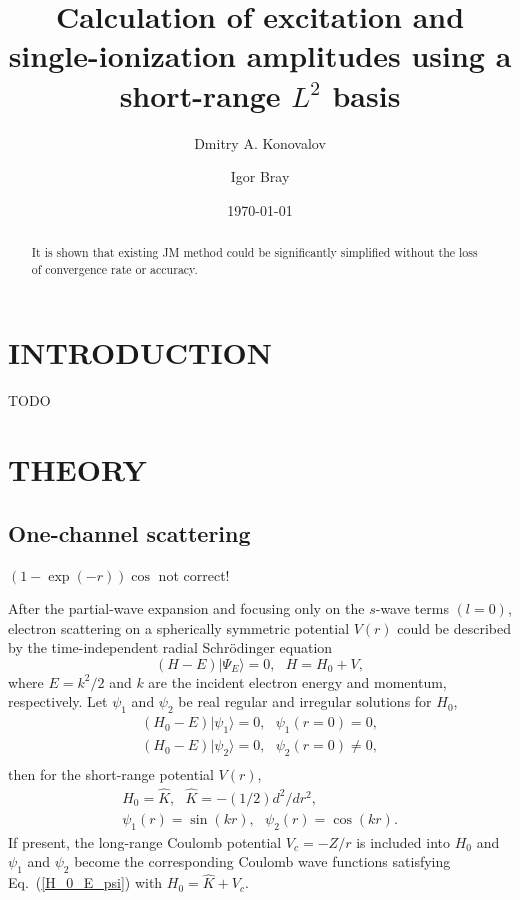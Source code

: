 \documentclass[aip
, pra
, showpacs
, aps
, twocolumn
, groupedaddress
, floatfix
]{revtex4}
\newcommand{\beq}{\begin{equation}}
\newcommand{\eeq}{\end{equation}}
\newcommand{\barr}{\begin{array}}
\newcommand{\earr}{\end{array}}
\begin{document}
\title {Calculation of excitation and single-ionization amplitudes using a short-range $L^2$ basis}

\author{Dmitry A. Konovalov}

\author{Igor Bray}


\date{\today}

\begin{abstract}
It is shown that existing JM method could be significantly simplified without the loss of convergence rate or accuracy.

\end{abstract}

\maketitle

\section{INTRODUCTION}
TODO

\section{THEORY}
\subsection{One-channel scattering}


$(1-\exp(-r))\cos$ \cite{Nesbet68} not correct!


After the partial-wave expansion \cite{Taylor72,N82} and focusing only on the $s$-wave terms $(l=0)$,
electron scattering on a spherically symmetric potential $V(r)$
could be described by the time-independent radial Schr\"odinger equation
\beq
(H-E) | \Psi_E \rangle =0,  \ \ \ H = H_0 + V, \label{H_E_Psi_E}
\eeq
where $E=k^2/2$ and $k$ are the incident electron energy and momentum, respectively.
Let $\psi_1$ and $\psi_2$ be real regular and irregular solutions for $H_0$,
\beq \barr{l}
(H_0-E) | \psi_1 \rangle =0,  \ \ \ \psi_1(r=0) = 0,\\
(H_0-E) | \psi_2 \rangle =0,  \ \ \ \psi_2(r=0) \neq 0,\\
\earr \label{H_0_E_psi}\eeq
then for the short-range potential $V(r)$,
\beq \barr{l}
H_0 = \hat{K},\ \ \ \hat{K} = -(1/2) d^2/dr^2,\\
\psi_1(r) = \sin(kr), \ \ \ \psi_2(r) = \cos(kr).
\earr \label{K} \eeq
If present, the long-range Coulomb potential $V_c=-Z/r$ is included into $H_0$
and $\psi_1$ and $\psi_2$ become the corresponding Coulomb wave functions satisfying Eq.~(\ref{H_0_E_psi})
with $H_0 = \hat{K} + V_c$.
\end{document}
